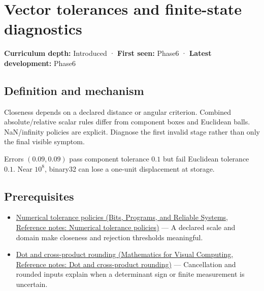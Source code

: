 \hypertarget{appendix-b5b83329215b}{}\label{referencestart:appendix-b5b83329215b}
\section{Vector tolerances and finite-state diagnostics}\label{appendix-b5b83329215b-vector-tolerances-and-finite-state-diagnostics}

\hypertarget{appendix-b5b83329215b-vector-tolerances-and-finite-state-diagnostics}{}

\textbf{Curriculum depth:} Introduced · \textbf{First seen:} Phase6 · \textbf{Latest development:} Phase6

\begin{allmightroledefinition}

\subsection{Definition and mechanism}\label{appendix-b5b83329215b-definition-and-mechanism}

\hypertarget{appendix-b5b83329215b-definition-and-mechanism}{}

Closeness depends on a declared distance or angular criterion. Combined absolute/relative scalar rules differ from component boxes and Euclidean balls. NaN/infinity policies are explicit. Diagnose the first invalid stage rather than only the final visible symptom.

\end{allmightroledefinition}

Errors \((0.09,0.09)\) pass component tolerance \(0.1\) but fail Euclidean tolerance \(0.1\). Near \(10^8\), binary32 can lose a one-unit displacement at storage.

\subsection{Prerequisites}\label{appendix-b5b83329215b-prerequisites}

\hypertarget{appendix-b5b83329215b-prerequisites}{}

\begin{itemize}
\tightlist
\item
  \href{../01-Bits-Programs-and-Reliable-Systems/main.pdf\#nameddest=appendix-0ec599f8ba27}{Numerical tolerance policies (Bits, Programs, and Reliable Systems, Reference notes: Numerical tolerance policies)} --- A declared scale and domain make closeness and rejection thresholds meaningful.
\item
  \href{../02-Mathematics-for-Visual-Computing/main.pdf\#nameddest=appendix-5aef4f13483a}{Dot and cross-product rounding (Mathematics for Visual Computing, Reference notes: Dot and cross-product rounding)} --- Cancellation and rounded inputs explain when a determinant sign or finite measurement is uncertain.
\end{itemize}

